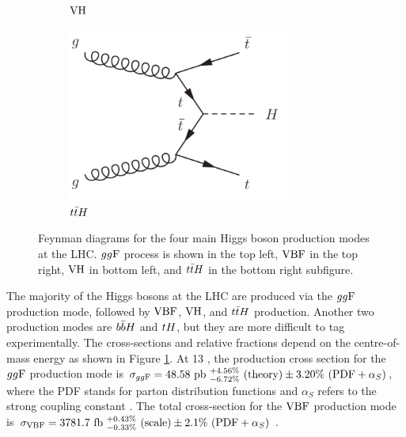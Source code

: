 \begin{figure}[h]
\begin{subfigure}[b]{0.5\textwidth}
    \caption{$\text{VH}$}
  \end{subfigure}%
  \begin{subfigure}[b]{0.5\textwidth}
    \centering
    \includegraphics[width=0.8\textwidth]{figures/theory/ttH}
    \caption{$t\bar{t} H$}
  \end{subfigure}
  \caption[Feynman diagrams for the four main Higgs boson production modes at the LHC.]
  {Feynman diagrams for the four main Higgs boson production modes at the LHC.
  $gg\text{F}$ process is shown in the top left, $\text{VBF}$ in the top right, $\text{VH}$ in bottom left, and
  $t\bar{t} H$ in the bottom right subfigure.}
   \label{fig:the:prod}
\end{figure}

The majority of the Higgs bosons at the LHC are produced via the $gg\text{F}$ production mode,
followed by $\text{VBF}$, $\text{VH}$, and $t\bar{t} H$ production. Another two production modes are $b\bar{b} H$
and $tH$, but they are more difficult to tag experimentally. The cross-sections and
relative fractions depend on the centre-of-mass energy as shown in Figure \ref{fig:the:prod}.
At 13 \TeV, the production cross section for the $gg\text{F}$ production mode is
$\sigma_{gg\text{F}} = 48.58~\text{pb}
~^{+4.56\%}_{-6.72\%}~(\text{theory})
\pm 3.20\%~(\text{PDF}+\alpha_S)$,
where the PDF stands for parton distribution functions and $\alpha_S$ refers to the strong
coupling constant \cite{deFlorian:2016spz}. The total cross-section for the $\text{VBF}$ production mode is
$\sigma_{\text{VBF}} = 3781.7~\text{fb}
~^{+0.43\%}_{-0.33\%}~(\text{scale})
\pm 2.1\%~(\text{PDF}+\alpha_S) $ \cite{deFlorian:2016spz}.


